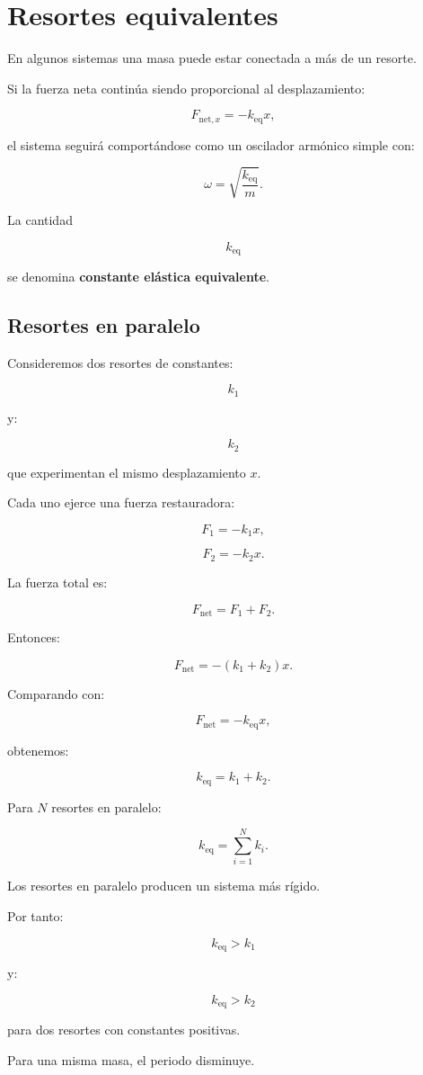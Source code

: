 \section{Resortes equivalentes}

En algunos sistemas una masa puede estar conectada a más de un resorte.

Si la fuerza neta continúa siendo proporcional al desplazamiento:

\[ F_{\text{net},x}=-k_{\mathrm{eq}}x, \]

el sistema seguirá comportándose como un oscilador armónico simple con:

\[ \boxed{\omega=\sqrt{\frac{k_{\mathrm{eq}}}{m}}}. \]

La cantidad

\[ k_{\mathrm{eq}} \]

se denomina \textbf{constante elástica equivalente}.


\subsection{Resortes en paralelo}

Consideremos dos resortes de constantes:

\[ k_1 \]

y:

\[ k_2 \]

que experimentan el mismo desplazamiento \(x\).

Cada uno ejerce una fuerza restauradora:

\[ F_1=-k_1x, \]

\[ F_2=-k_2x. \]

La fuerza total es:

\[ F_{\text{net}}=F_1+F_2. \]

Entonces:

\[ F_{\text{net}}=-(k_1+k_2)x. \]

Comparando con:

\[ F_{\text{net}}=-k_{\mathrm{eq}}x, \]

obtenemos:

\[ \boxed{k_{\mathrm{eq}}=k_1+k_2}. \]

Para \(N\) resortes en paralelo:

\[ \boxed{k_{\mathrm{eq}}=\sum_{i=1}^{N}k_i}. \]

\begin{interpretacion}
Los resortes en paralelo producen un sistema más rígido.

Por tanto:

\[ k_{\mathrm{eq}}>k_1 \]

y:

\[ k_{\mathrm{eq}}>k_2 \]

para dos resortes con constantes positivas.

Para una misma masa, el periodo disminuye.
\end{interpretacion}


